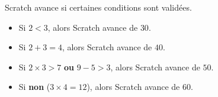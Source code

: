 \documentclass[class=report,crop=false, 12pt]{standalone}
\begin{document}
\begin{enigme}

Scratch avance si certaines conditions sont validées.

\medskip

\begin{minipage}{0.49\textwidth}
\begin{itemize}
  \item Si \og{}$2<3$\fg{}, alors Scratch avance de $30$.
  
\vspace*{6ex}  
  
  \item Si \og{}$2+3=4$\fg{}, alors Scratch avance de $40$.
  
\vspace*{6ex}    
  
  \item Si \og{}$2 \times 3 > 7$ \textbf{ou} $9-5 > 3$\fg{}, alors Scratch avance de $50$. 
  
\vspace*{6ex}    
     
  \item Si \og{}\textbf{non} ($3 \times 4 = 12$)\fg{}, alors Scratch avance de $60$. 
\end{itemize}   
\end{minipage}
\begin{minipage}{0.49\textwidth}
\begin{center}

\begin{scratch}
  { 
  }

  \blockspace[0.5]

  { 
  }

  \blockspace[0.5]

  { 
  }

  \blockspace[0.5]

  { 
  }


\end{scratch}
\end{center}
\end{minipage}
\end{enigme}
\end{document}
